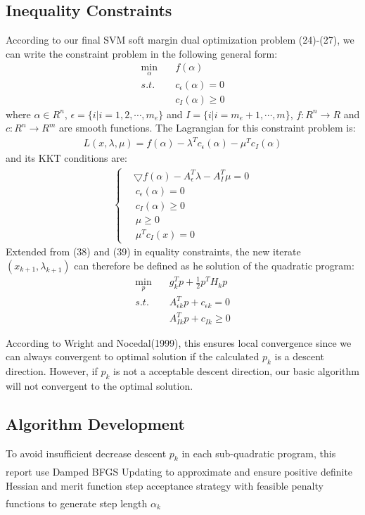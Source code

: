 \documentclass{article}
\newcommand{\upcite}[1]{\textsuperscript{\textsuperscript{\cite{#1}}}}
\begin{document}
\begin{spacing}{1.5}
\subsection{Inequality Constraints}
According to our final SVM soft margin dual optimization problem (24)-(27), we can write the constraint problem in the following general form:
\begin{align}
\min_{\alpha}&\quad f(\alpha)\\
s.t. &\quad c_\epsilon(\alpha)=0\\
&\quad c_I(\alpha)\ge0
\end{align}
where $\alpha\in R^n$, $\epsilon=\{i|i=1,2,\cdots,m_e\}$ and $I=\{i|i=m_e+1,\cdots,m\}$, $f: R^n\to R$ and $c: R^n\to R^m$ are smooth functions. The Lagrangian for this constraint problem is:
\begin{align}
L(x,\lambda,\mu)=f(\alpha)-\lambda^Tc_\epsilon(\alpha)-\mu^Tc_I(\alpha)
\end{align}
and its KKT conditions are:
\begin{align}
\left\{
\begin{aligned}
&\bigtriangledown f(\alpha)-A_\epsilon^T\lambda-A_I^T\mu=0\\
&\ c_\epsilon(\alpha)=0\\
&\ c_I(\alpha)\ge0\\
&\ \mu\ge0\\
&\ \mu^Tc_I(x)=0
\end{aligned}
\right.
\end{align}
Extended from (38) and (39) in equality constraints, the new iterate $(x_{k+1}, \lambda_{k+1})$ can therefore be defined as he solution of the quadratic program:
\begin{align}
\min_p &\quad g_k^Tp+\frac{1}{2}p^TH_kp\\
s.t.&\quad A_{\epsilon k}^Tp+c_{\epsilon k}=0\\
&\quad A_{Ik}^Tp+c_{Ik}\ge0
\end{align}

According to Wright and Nocedal(1999), this ensures local convergence since we can always convergent to optimal solution if the calculated $p_k$ is a descent direction. However, if $p_k$ is not a acceptable descent direction, our basic algorithm will not convergent to the optimal solution.\par

\subsection{Algorithm Development}
To avoid insufficient decrease descent $p_k$ in each sub-quadratic program, this report use Damped BFGS Updating\upcite{Ref7} to approximate and ensure positive definite Hessian and merit function step acceptance strategy with feasible penalty functions\upcite{Ref8} to generate step length $\alpha_k$

\end{spacing}
\end{document}
